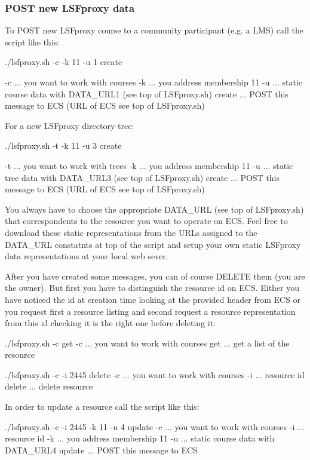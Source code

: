 \subsubsection{POST new LSFproxy data}
To POST new LSFproxy course to a community participant (e.g. a LMS) call the
script like this:
\begin{code}
  ./lsfproxy.sh -c -k 11 -u 1 create

  -c ... you want to work with courses
  -k ... you address membership 11
  -u ... static course data with DATA_URL1 (see top of LSFproxy.sh)
  create ... POST this message to ECS (URL of ECS see top of LSFproxy.sh)
\end{code}
For a new LSFproxy directory-tree:
\begin{code}
  ./lsfproxy.sh -t -k 11 -u 3 create

  -t ... you want to work with trees
  -k ... you address membership 11
  -u ... static tree data with DATA_URL3 (see top of LSFproxy.sh)
  create ... POST this message to ECS (URL of ECS see top of LSFproxy.sh)
\end{code}

You always have to choose the appropriate DATA\_URL (see top of LSFproxy.sh)
that correspondents to the resource you want to operate on ECS. Feel free to
download these static representations from the URLs assigned to the DATA\_URL
constatnts at top of the script and setup your own static LSFproxy data
representations at your local web sever.

After you have created some messages, you can of course DELETE them (you are
the owner). But first you have to distinguish the resource id on ECS. Either
you have noticed the id at creation time looking at the provided 
header from ECS or you request first a resource listing and second request a
resource representation from this id checking it is the right one before
deleting it:
\begin{code}
  ./lsfproxy.sh -c get
  -c ... you want to work with courses
  get ... get a list of the resource

  ./lsfproxy.sh -c -i 2445 delete
  -c ... you want to work with courses
  -i ... resource id
  delete ... delete resource
\end{code}
In order to update a resource call the script like this:
\begin{code}
  ./lsfproxy.sh -c -i 2445 -k 11 -u 4 update
  -c ... you want to work with courses
  -i ... resource id
  -k ... you address membership 11
  -u ... static course data with DATA_URL4
  update ... POST this message to ECS
\end{code}

